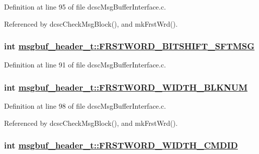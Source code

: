 Definition at line 95 of file dcsc\-Msg\-Buffer\-Interface.c.

Referenced by dcsc\-Check\-Msg\-Block(), and mk\-Frst\-Wrd().\hypertarget{structmsgbuf__header__t_8b168b71e1c62e52b43ddce2a1b777dc}{
\subsubsection[FRSTWORD\_\-BITSHIFT\_\-SFTMSG]{\setlength{\rightskip}{0pt plus 5cm}int \hyperlink{structmsgbuf__header__t_8b168b71e1c62e52b43ddce2a1b777dc}{msgbuf\_\-header\_\-t::FRSTWORD\_\-BITSHIFT\_\-SFTMSG}}}
\label{structmsgbuf__header__t_8b168b71e1c62e52b43ddce2a1b777dc}




Definition at line 91 of file dcsc\-Msg\-Buffer\-Interface.c.\hypertarget{structmsgbuf__header__t_5a5421dab3b5eab22b180a8971bc9c2f}{
\subsubsection[FRSTWORD\_\-WIDTH\_\-BLKNUM]{\setlength{\rightskip}{0pt plus 5cm}int \hyperlink{structmsgbuf__header__t_5a5421dab3b5eab22b180a8971bc9c2f}{msgbuf\_\-header\_\-t::FRSTWORD\_\-WIDTH\_\-BLKNUM}}}
\label{structmsgbuf__header__t_5a5421dab3b5eab22b180a8971bc9c2f}




Definition at line 98 of file dcsc\-Msg\-Buffer\-Interface.c.

Referenced by dcsc\-Check\-Msg\-Block(), and mk\-Frst\-Wrd().\hypertarget{structmsgbuf__header__t_10a75f96f061399a714ed5e4b37c1439}{
\subsubsection[FRSTWORD\_\-WIDTH\_\-CMDID]{\setlength{\rightskip}{0pt plus 5cm}int \hyperlink{structmsgbuf__header__t_10a75f96f061399a714ed5e4b37c1439}{msgbuf\_\-header\_\-t::FRSTWORD\_\-WIDTH\_\-CMDID}}}
\label{structmsgbuf__header__t_10a75f96f061399a714ed5e4b37c1439}




